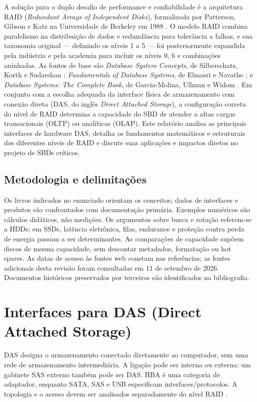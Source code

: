 \documentclass[titlepage]{article}
\begin{document}
A solução para o duplo desafio de performance e confiabilidade é a arquitetura RAID (\textit{Redundant Arrays of Independent Disks}), formalizada por Patterson, Gibson e Katz na Universidade de Berkeley em 1988 \cite{patterson1988}. O modelo RAID combina paralelismo na distribuição de dados e redundância para tolerância a falhas, e sua taxonomia original --- definindo os níveis 1 a 5 --- foi posteriormente expandida pela indústria e pela academia para incluir os níveis 0, 6 e combinações aninhadas. As fontes de base são \textit{Database System Concepts}, de Silberschatz, Korth e Sudarshan \cite{silberschatz2020}; \textit{Fundamentals of Database Systems}, de Elmasri e Navathe \cite{elmasri2016}; e \textit{Database Systems: The Complete Book}, de Garcia-Molina, Ullman e Widom \cite{garciamolina2009}. Em conjunto com a escolha adequada da interface física de armazenamento com conexão direta (DAS, do inglês \textit{Direct Attached Storage}), a configuração correta do nível de RAID determina a capacidade do SBD de atender a altas cargas transacionais (OLTP) ou analíticas (OLAP). Este relatório analisa as principais interfaces de hardware DAS, detalha os fundamentos matemáticos e estruturais dos diferentes níveis de RAID e discute suas aplicações e impactos diretos no projeto de SBDs críticos.

\subsection{Metodologia e delimitações}
Os livros indicados no enunciado orientam os conceitos; dados de interfaces e produtos são confrontados com documentação primária. Exemplos numéricos são cálculos didáticos, não medições. Os argumentos sobre busca e rotação referem-se a HDDs; em SSDs, latência eletrônica, filas, endurance e proteção contra perda de energia passam a ser determinantes. As comparações de capacidade supõem discos de mesma capacidade, sem descontar metadados, formatação ou hot spares. As datas de acesso às fontes web constam nas referências; as fontes adicionais desta revisão foram consultadas em 11 de setembro de 2026. Documentos históricos preservados por terceiros são identificados na bibliografia.

\section{Interfaces para DAS (Direct Attached Storage)}
\label{sec:interfaces_das}
DAS designa o armazenamento conectado diretamente ao computador, sem uma rede de armazenamento intermediária. A ligação pode ser interna ou externa; um gabinete SAS externo também pode ser DAS. HBA é uma categoria de adaptador, enquanto SATA, SAS e USB especificam interfaces/protocolos. A topologia e o acesso devem ser analisados separadamente do nível RAID \cite{snia_dictionary}.
\end{document}
